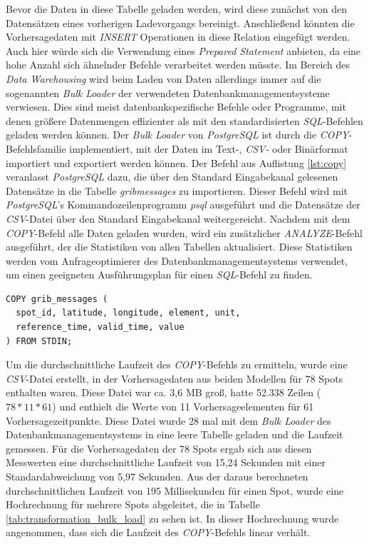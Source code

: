 Bevor die Daten in diese Tabelle geladen werden, wird diese zunächst
von den Datensätzen eines vorherigen Ladevorgangs
bereinigt. Anschließend könnten die Vorhersagedaten mit
\textit{INSERT} Operationen in diese Relation eingefügt werden. Auch
hier würde sich die Verwendung eines \textit{Prepared Statement}
anbieten, da eine hohe Anzahl sich ähnelnder Befehle verarbeitet
werden müsste. Im Bereich des \textit{Data Warehousing} wird beim
Laden von Daten allerdings immer auf die sogenannten \textit{Bulk
  Loader} der verwendeten Datenbankmanagementsysteme verwiesen. Dies
sind meist datenbankspezifische Befehle oder Programme, mit denen
größere Datenmengen effizienter als mit den standardisierten
\textit{SQL}-Befehlen geladen werden können. Der \textit{Bulk Loader}
von \textit{PostgreSQL} ist durch die \textit{COPY}-Befehlsfamilie
implementiert, mit der Daten im Text-, \textit{CSV-} oder Binärformat
importiert und exportiert werden können. Der Befehl aus Auflistung
\ref{lst:copy} veranlasst \textit{PostgreSQL} dazu, die über den
Standard Eingabekanal gelesenen Datensätze in die Tabelle
\textit{grib\textunderscore messages} zu importieren. Dieser Befehl
wird mit \textit{PostgreSQL}'s Kommandozeilenprogramm \textit{psql}
ausgeführt und die Datensätze der \textit{CSV}-Datei über den Standard
Eingabekanal weitergereicht. Nachdem mit dem \textit{COPY}-Befehl alle
Daten geladen wurden, wird ein zusätzlicher \textit{ANALYZE}-Befehl
ausgeführt, der die Statistiken von allen Tabellen aktualisiert. Diese
Statistiken werden vom Anfrageoptimierer des
Datenbankmanagementsystems verwendet, um einen geeigneten
Ausführungsplan für einen \textit{SQL}-Befehl zu finden.

\begin{lstlisting}[captionpos=b, caption=Befehl zum Import von Datensätzen in \textit{PostgreSQL}, label=lst:copy]
COPY grib_messages (
  spot_id, latitude, longitude, element, unit, 
  reference_time, valid_time, value
) FROM STDIN;
\end{lstlisting}

Um die durchschnittliche Laufzeit des \textit{COPY}-Befehls zu
ermitteln, wurde eine \textit{CSV}-Datei erstellt, in der
Vorhersagedaten aus beiden Modellen für 78 Spots enthalten
waren. Diese Datei war ca. 3,6 MB groß, hatte 52.338 Zeilen ($78 * 11
* 61$) und enthielt die Werte von 11 Vorhersageelementen für 61
Vorhersagezeitpunkte. Diese Datei wurde 28 mal mit dem \textit{Bulk
  Loader} des Datenbankmanagementsystems in eine leere Tabelle geladen
und die Laufzeit gemessen. Für die Vorhersagedaten der 78 Spots ergab
sich aus diesen Messwerten eine durchschnittliche Laufzeit von 15,24
Sekunden mit einer Standardabweichung von 5,97 Sekunden. Aus der
daraus berechneten durchschnittlichen Laufzeit von 195 Millisekunden
für einen Spot, wurde eine Hochrechnung für mehrere Spots abgeleitet,
die in Tabelle \ref{tab:transformation_bulk_load} zu sehen ist. In
dieser Hochrechnung wurde angenommen, dass sich die Laufzeit des
\textit{COPY}-Befehls linear verhält.

